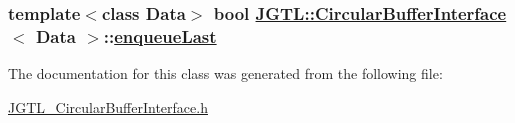 \hypertarget{class_j_g_t_l_1_1_circular_buffer_interface_b7397cb8c8d70d7672fb23bbb451bdef}{
\subsubsection[enqueueLast]{\setlength{\rightskip}{0pt plus 5cm}template$<$class Data$>$ bool \hyperlink{class_j_g_t_l_1_1_circular_buffer_interface}{JGTL::Circular\-Buffer\-Interface}$<$ Data $>$::\hyperlink{class_j_g_t_l_1_1_circular_buffer_interface_b7397cb8c8d70d7672fb23bbb451bdef}{enqueue\-Last}}}
\label{class_j_g_t_l_1_1_circular_buffer_interface_b7397cb8c8d70d7672fb23bbb451bdef}




The documentation for this class was generated from the following file:\begin{CompactItemize}
\item 
\hyperlink{_j_g_t_l___circular_buffer_interface_8h}{JGTL\_\-Circular\-Buffer\-Interface.h}\end{CompactItemize}
